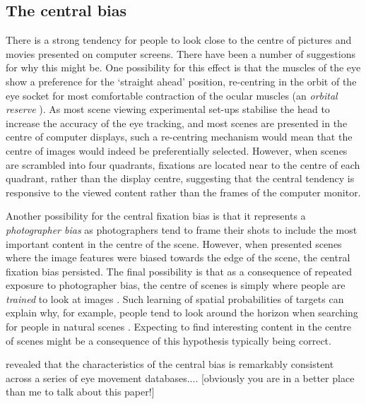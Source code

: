 \documentclass[a4paper, twocolumn, oneside, 11pt]{article}
\begin{document}
\subsection{The central bias}
There is a strong tendency for people to look close to the centre of pictures \citep{Tatler:2007hk,Tatler:2005bw, Canosa:2003tu, Clarke:2014km} and movies \citep{Tseng:2009jn} presented on computer screens. There have been a number of suggestions for why this might be. One possibility for this effect is that the muscles of the eye show a preference for the `straight ahead' position, re-centring in the orbit of the eye socket for most comfortable contraction of the ocular muscles (an \emph{orbital reserve} \citep{Fuller:1996bx}). As most scene viewing experimental set-ups stabilise the head to increase the accuracy of the eye tracking, and most scenes are presented in the centre of computer displays, such a re-centring mechanism would mean that the centre of images would indeed be preferentially selected. However, when scenes are scrambled into four quadrants, fixations are located near to the centre of each quadrant, rather than the display centre, suggesting that the central tendency is responsive to the viewed content \citep{Stainer:2013ce} rather than the frames of the computer monitor.

Another possibility for the central fixation bias is that it represents a \emph{photographer bias} as photographers tend to frame their shots to include the most important content in the centre of the scene. However, when \cite{Tatler:2007hk} presented scenes where the image features were biased towards the edge of the scene, the central fixation bias persisted. The final possibility is that as a consequence of repeated exposure to photographer bias, the centre of scenes is simply where people are \emph{trained} to look at images \citep{Parkhurst:2002vo}. Such learning of spatial probabilities of targets can explain why, for example, people tend to look around the horizon when searching for people in natural scenes \citep{Birmingham:2009hl, Torralba:2006iq, Ehinger:2009ji}. Expecting to find interesting content in the centre of scenes might be a consequence of this hypothesis typically being correct.

\cite{clarke-tatler2014} revealed that the characteristics of the central bias is remarkably consistent across a series of eye movement databases.... [obviously you are in a better place than me to talk about this paper!]
\end{document}
